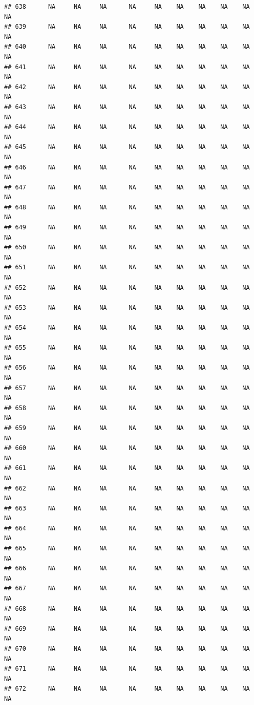 \documentclass{article}\usepackage{graphicx, color}
\makeatletter
\newenvironment{kframe}{%
 \def\at@end@of@kframe{}%
 \ifinner\ifhmode%
  \def\at@end@of@kframe{\end{minipage}}%
  \begin{minipage}{\columnwidth}%
 \fi\fi%
 \def\FrameCommand##1{\hskip\@totalleftmargin \hskip-\fboxsep
 \colorbox{shadecolor}{##1}\hskip-\fboxsep
     \hskip-\linewidth \hskip-\@totalleftmargin \hskip\columnwidth}%
 \MakeFramed {\advance\hsize-\width
   \@totalleftmargin\z@ \linewidth\hsize
   \@setminipage}}%
 {\par\unskip\endMakeFramed%
 \at@end@of@kframe}
\newenvironment{knitrout}{}{} %
\makeatother
\begin{document}
\begin{knitrout}
\begin{kframe}
\begin{verbatim}
## 638      NA     NA     NA      NA     NA    NA    NA    NA    NA     NA
## 639      NA     NA     NA      NA     NA    NA    NA    NA    NA     NA
## 640      NA     NA     NA      NA     NA    NA    NA    NA    NA     NA
## 641      NA     NA     NA      NA     NA    NA    NA    NA    NA     NA
## 642      NA     NA     NA      NA     NA    NA    NA    NA    NA     NA
## 643      NA     NA     NA      NA     NA    NA    NA    NA    NA     NA
## 644      NA     NA     NA      NA     NA    NA    NA    NA    NA     NA
## 645      NA     NA     NA      NA     NA    NA    NA    NA    NA     NA
## 646      NA     NA     NA      NA     NA    NA    NA    NA    NA     NA
## 647      NA     NA     NA      NA     NA    NA    NA    NA    NA     NA
## 648      NA     NA     NA      NA     NA    NA    NA    NA    NA     NA
## 649      NA     NA     NA      NA     NA    NA    NA    NA    NA     NA
## 650      NA     NA     NA      NA     NA    NA    NA    NA    NA     NA
## 651      NA     NA     NA      NA     NA    NA    NA    NA    NA     NA
## 652      NA     NA     NA      NA     NA    NA    NA    NA    NA     NA
## 653      NA     NA     NA      NA     NA    NA    NA    NA    NA     NA
## 654      NA     NA     NA      NA     NA    NA    NA    NA    NA     NA
## 655      NA     NA     NA      NA     NA    NA    NA    NA    NA     NA
## 656      NA     NA     NA      NA     NA    NA    NA    NA    NA     NA
## 657      NA     NA     NA      NA     NA    NA    NA    NA    NA     NA
## 658      NA     NA     NA      NA     NA    NA    NA    NA    NA     NA
## 659      NA     NA     NA      NA     NA    NA    NA    NA    NA     NA
## 660      NA     NA     NA      NA     NA    NA    NA    NA    NA     NA
## 661      NA     NA     NA      NA     NA    NA    NA    NA    NA     NA
## 662      NA     NA     NA      NA     NA    NA    NA    NA    NA     NA
## 663      NA     NA     NA      NA     NA    NA    NA    NA    NA     NA
## 664      NA     NA     NA      NA     NA    NA    NA    NA    NA     NA
## 665      NA     NA     NA      NA     NA    NA    NA    NA    NA     NA
## 666      NA     NA     NA      NA     NA    NA    NA    NA    NA     NA
## 667      NA     NA     NA      NA     NA    NA    NA    NA    NA     NA
## 668      NA     NA     NA      NA     NA    NA    NA    NA    NA     NA
## 669      NA     NA     NA      NA     NA    NA    NA    NA    NA     NA
## 670      NA     NA     NA      NA     NA    NA    NA    NA    NA     NA
## 671      NA     NA     NA      NA     NA    NA    NA    NA    NA     NA
## 672      NA     NA     NA      NA     NA    NA    NA    NA    NA     NA

\end{verbatim}
\end{kframe}
\end{knitrout}
\end{document}
